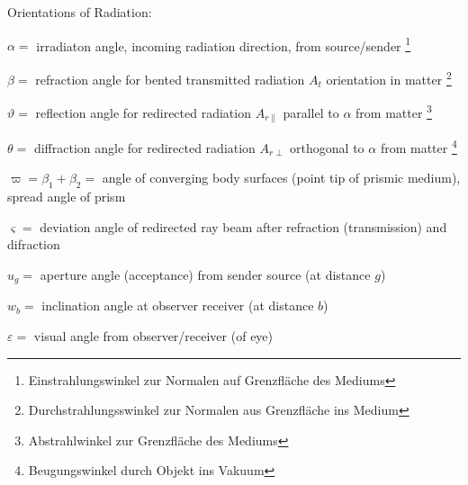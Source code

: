 Orientations of Radiation:

$ \alpha = $ irradiaton angle, incoming radiation direction, from source/sender \footnote{Einstrahlungswinkel zur Normalen auf Grenzfläche des Mediums}

$ \beta = $ refraction angle for bented transmitted radiation $A_{t}$ orientation in matter \footnote{Durchstrahlungsswinkel zur Normalen aus Grenzfläche ins Medium}

$ \vartheta = $ reflection angle for redirected radiation $A_{r\parallel}$ parallel to $\alpha$ from matter \footnote{Abstrahlwinkel zur Grenzfläche des Mediums}

$ \theta = $ diffraction angle for redirected radiation $A_{r\perp}$ orthogonal to $\alpha$ from matter \footnote{Beugungswinkel durch Objekt ins Vakuum}

$ \varpi = \beta_1 + \beta_2 = $ angle of converging body surfaces (point tip of prismic medium), spread angle of prism

$ \varsigma = $ deviation angle of redirected ray beam after refraction (transmission) and difraction

$ u_g = $ aperture angle (acceptance) from sender source (at distance $g$)

$ w_b = $ inclination angle at observer receiver (at distance $b$)

$ \varepsilon = $ visual angle from observer/receiver (of eye)

\vspace{10ex}

